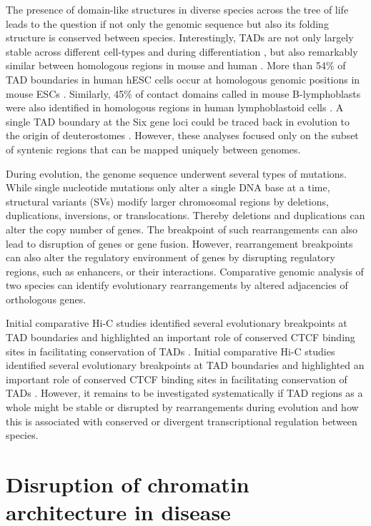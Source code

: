 \documentclass[a4paper,twoside=true,openright,parskip=full,chapterprefix=true,11pt,headings=normal,bibliography=totoc,listof=totoc,titlepage=on,captions=tableabove,draft=false]{scrreprt}
\theoremstyle{definition}
\theoremstyle{definition}
\theoremstyle{definition}
\theoremstyle{remark}
\begin{document}
The presence of domain-like structures in diverse species across the
tree of life leads to the question if not only the genomic sequence but
also its folding structure is conserved between species. Interestingly,
TADs are not only largely stable across different cell-types
\citep{Dixon2012, Rao2014} and during differentiation \citep{Dixon2015},
but also remarkably similar between homologous regions in mouse and
human \citep{Dixon2012}. More than 54\% of TAD boundaries in human hESC
cells occur at homologous genomic positions in mouse ESCs
\citep{Dixon2012}. Similarly, 45\% of contact domains called in mouse
B-lymphoblasts were also identified in homologous regions in human
lymphoblastoid cells \citep{Rao2014}. A single TAD boundary at the Six
gene loci could be traced back in evolution to the origin of
deuterostomes \citep{Gomez-Marin2015}. However, these analyses focused
only on the subset of syntenic regions that can be mapped uniquely
between genomes.

During evolution, the genome sequence underwent several types of
mutations. While single nucleotide mutations only alter a single DNA
base at a time, structural variants (SVs) modify larger chromosomal
regions by deletions, duplications, inversions, or translocations.
Thereby deletions and duplications can alter the copy number of genes.
The breakpoint of such rearrangements can also lead to disruption of
genes or gene fusion. However, rearrangement breakpoints can also alter
the regulatory environment of genes by disrupting regulatory regions,
such as enhancers, or their interactions. Comparative genomic analysis
of two species can identify evolutionary rearrangements by altered
adjacencies of orthologous genes.

Initial comparative Hi-C studies identified several evolutionary
breakpoints at TAD boundaries and highlighted an important role of
conserved CTCF binding sites in facilitating conservation of TADs
\citep{VietriRudan2015}. Initial comparative Hi-C studies identified
several evolutionary breakpoints at TAD boundaries and highlighted an
important role of conserved CTCF binding sites in facilitating
conservation of TADs \citep{VietriRudan2015}. However, it remains to be
investigated systematically if TAD regions as a whole might be stable or
disrupted by rearrangements during evolution and how this is associated
with conserved or divergent transcriptional regulation between species.

\hypertarget{disruption-of-chromatin-architecture-in-disease}{%
\section{Disruption of chromatin architecture in
disease}\label{disruption-of-chromatin-architecture-in-disease}}
\end{document}
